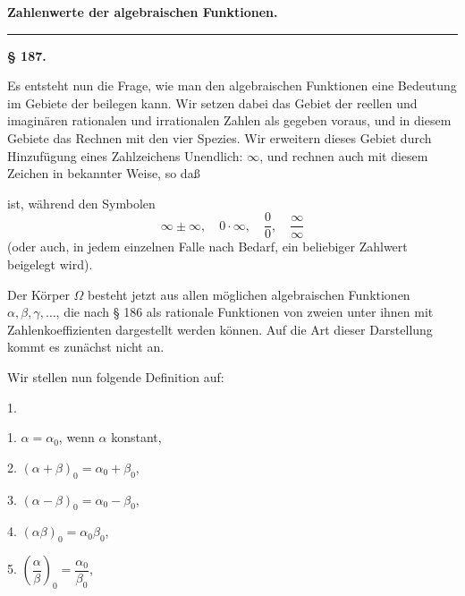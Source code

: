 
\begin{center}

\textbf{Zahlenwerte der algebraischen Funktionen.}

\rule{4cm}{0.4pt}

\textbf{§ 187. }
\end{center}

Es entsteht nun die Frage, wie man den algebraischen Funktionen
 eine Bedeutung im Gebiete der  beilegen kann. Wir
setzen dabei das Gebiet der reellen und imaginären rationalen
und irrationalen Zahlen als gegeben voraus, und in diesem
Gebiete das Rechnen mit den vier Spezies. Wir erweitern dieses
Gebiet durch Hinzufügung eines Zahlzeichens \glqq Unendlich\grqq{}: $\infty$,
und rechnen auch mit diesem Zeichen in bekannter Weise, so daß


ist, während den Symbolen
\[
\infty \pm \infty, \quad 0 \cdot \infty, \quad \frac{0}{0}, \quad \frac{\infty}{\infty}
\]
 (oder auch, in jedem einzelnen
Falle nach Bedarf, ein beliebiger Zahlwert beigelegt wird).

Der Körper $\Omega$ besteht jetzt aus allen möglichen algebraischen
Funktionen $\alpha, \beta, \gamma, \dots$, die nach § 186 als rationale Funktionen
von zweien unter ihnen mit Zahlenkoeffizienten dargestellt werden
können. Auf die Art dieser Darstellung kommt es zunächst
nicht an.

Wir stellen nun folgende Definition auf:

1. 

\begin{center}
\begin{minipage}{0.7\linewidth}
1. \quad $\alpha = \alpha_0$, wenn $\alpha$ konstant,

2. \quad $(\alpha + \beta)_0 = \alpha_0 + \beta_0$,

3. \quad $(\alpha - \beta)_0 = \alpha_0 - \beta_0$,

4. \quad $(\alpha\beta)_0 = \alpha_0\beta_0$,

5. \quad $\left(\dfrac{\alpha}{\beta}\right)_0 = \dfrac{\alpha_0}{\beta_0}$,
\end{minipage}
\end{center}
